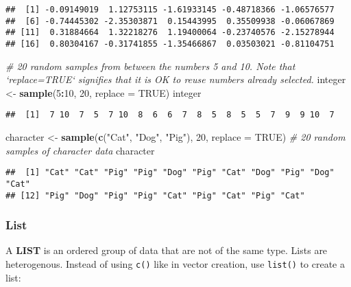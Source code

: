 \documentclass[]{article}
\newenvironment{Shaded}{\begin{snugshade}}{\end{snugshade}}
\newcommand{\KeywordTok}[1]{\textcolor[rgb]{0.13,0.29,0.53}{\textbf{#1}}}
\newcommand{\DataTypeTok}[1]{\textcolor[rgb]{0.13,0.29,0.53}{#1}}
\newcommand{\DecValTok}[1]{\textcolor[rgb]{0.00,0.00,0.81}{#1}}
\newcommand{\StringTok}[1]{\textcolor[rgb]{0.31,0.60,0.02}{#1}}
\newcommand{\CommentTok}[1]{\textcolor[rgb]{0.56,0.35,0.01}{\textit{#1}}}
\newcommand{\OtherTok}[1]{\textcolor[rgb]{0.56,0.35,0.01}{#1}}
\newcommand{\OperatorTok}[1]{\textcolor[rgb]{0.81,0.36,0.00}{\textbf{#1}}}
\newcommand{\NormalTok}[1]{#1}
\begin{document}
\begin{verbatim}
##  [1] -0.09149019  1.12753115 -1.61933145 -0.48718366 -1.06576577
##  [6] -0.74445302 -2.35303871  0.15443995  0.35509938 -0.06067869
## [11]  0.31884664  1.32218276  1.19400064 -0.23740576 -2.15278944
## [16]  0.80304167 -0.31741855 -1.35466867  0.03503021 -0.81104751
\end{verbatim}

\begin{Shaded}
\begin{Highlighting}[]
\CommentTok{# 20 random samples from between the numbers 5 and 10. Note that `replace=TRUE` signifies that it is OK to reuse numbers already selected.}
\NormalTok{integer <-}\StringTok{ }\KeywordTok{sample}\NormalTok{(}\DecValTok{5}\OperatorTok{:}\DecValTok{10}\NormalTok{, }\DecValTok{20}\NormalTok{, }\DataTypeTok{replace =} \OtherTok{TRUE}\NormalTok{) }
\NormalTok{integer}
\end{Highlighting}
\end{Shaded}

\begin{verbatim}
##  [1]  7 10  7  5  7 10  8  6  6  7  8  5  8  5  5  7  9  9 10  7
\end{verbatim}

\begin{Shaded}
\begin{Highlighting}[]
\NormalTok{character <-}\StringTok{ }\KeywordTok{sample}\NormalTok{(}\KeywordTok{c}\NormalTok{(}\StringTok{"Cat"}\NormalTok{, }\StringTok{"Dog"}\NormalTok{, }\StringTok{"Pig"}\NormalTok{), }\DecValTok{20}\NormalTok{, }\DataTypeTok{replace =} \OtherTok{TRUE}\NormalTok{) }\CommentTok{# 20 random samples of character data}
\NormalTok{character}
\end{Highlighting}
\end{Shaded}

\begin{verbatim}
##  [1] "Cat" "Cat" "Pig" "Pig" "Dog" "Pig" "Cat" "Dog" "Pig" "Dog" "Cat"
## [12] "Pig" "Dog" "Pig" "Pig" "Cat" "Pig" "Cat" "Pig" "Cat"
\end{verbatim}

\subsubsection{List}\label{list}

A \textbf{LIST} is an ordered group of data that are not of the same
type. Lists are heterogenous. Instead of using \texttt{c()} like in
vector creation, use \texttt{list()} to create a list:
\end{document}
